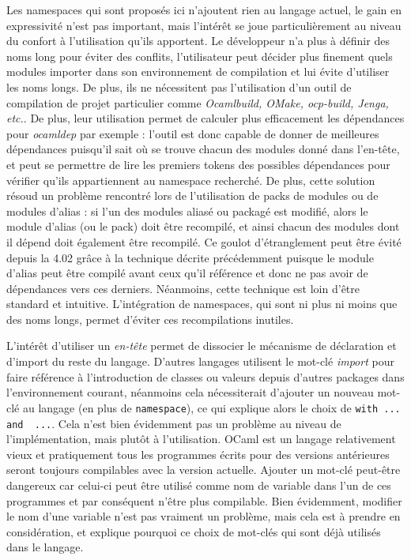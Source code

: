 \documentclass[11pt,a4paper]{report}
\begin{document}
Les namespaces qui sont proposés ici n'ajoutent rien au langage actuel, le gain
en expressivité n'est pas important, mais l'intérêt se joue particulièrement au
niveau du confort à l'utilisation qu'ils apportent. Le développeur n'a plus à
définir des noms long pour éviter des conflits, l'utilisateur peut décider plus
finement quels modules importer dans son environnement de compilation et lui
évite d'utiliser les noms longs. De plus, ils ne nécessitent pas l'utilisation
d'un outil de compilation de projet particulier comme \emph{Ocamlbuild, OMake,
  ocp-build, Jenga, etc.}. De plus, leur utilisation permet de calculer plus
efficacement les dépendances pour \emph{ocamldep} par exemple : l'outil est donc
capable de donner de meilleures dépendances puisqu'il sait où se trouve chacun
des modules donné dans l'en-tête, et peut se permettre de lire les premiers
tokens des possibles dépendances pour vérifier qu'ils appartiennent au namespace
recherché. De plus, cette solution résoud un problème rencontré lors de
l'utilisation de packs de modules ou de modules d'alias : si l'un des modules
aliasé ou packagé est modifié, alors le module d'alias (ou le pack) doit être
recompilé, et ainsi chacun des modules dont il dépend doit également être
recompilé. Ce goulot d'étranglement peut être évité depuis la 4.02 grâce à la
technique décrite précédemment puisque le module d'alias peut être compilé
avant ceux qu'il référence et donc ne pas avoir de dépendances vers ces
derniers. Néanmoins, cette technique est loin d'être standard et
intuitive. L'intégration de namespaces, qui sont ni plus ni moins que des noms
longs, permet d'éviter ces recompilations inutiles.

L'intérêt d'utiliser un \emph{en-tête} permet de dissocier le mécanisme de
déclaration et d'import du reste du langage. D'autres langages utilisent le
mot-clé \emph{import} pour faire référence à l'introduction de classes ou
valeurs depuis d'autres packages dans l'environnement courant, néanmoins cela
nécessiterait d'ajouter un nouveau mot-clé au langage (en plus de
\texttt{namespace}), ce qui explique alors le choix de 
\lstinline{with ... and  ...}. 
Cela n'est bien évidemment pas un problème au niveau de
l'implémentation, mais plutôt à l'utilisation. OCaml est un langage relativement
vieux et pratiquement tous les programmes écrits pour des versions antérieures
seront toujours compilables avec la version actuelle. Ajouter un mot-clé
peut-être dangereux car celui-ci peut être utilisé comme nom de variable dans
l'un de ces programmes et par conséquent n'être plus compilable. Bien
évidemment, modifier le nom d'une variable n'est pas vraiment un problème, mais
cela est à prendre en considération, et explique pourquoi ce choix de mot-clés
qui sont déjà utilisés dans le langage.
\end{document}
